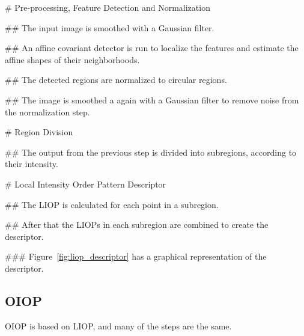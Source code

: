 \NewList{}
\begin{easylist}[tractatus]

  # Pre-processing, Feature Detection and Normalization

  ## The input image is smoothed with a Gaussian filter.

  ## An affine covariant detector is run to localize the features and estimate
  the affine shapes of their neighborhoods.

  ## The detected regions are normalized to circular regions.

  ## The image is smoothed a again with a Gaussian filter to remove noise from
  the normalization step.

  # Region Division

  ## The output from the previous step is divided into subregions, according to
  their intensity.

  # Local Intensity Order Pattern Descriptor

  ## The LIOP is calculated for each point in a subregion.

  ## After that the LIOPs in each subregion are combined to create the
  descriptor.

  ### Figure~\ref{fig:liop_descriptor} has a graphical representation of the
  descriptor.

\end{easylist}

\subsection{OIOP}

OIOP is based on LIOP, and many of the steps are the same.

